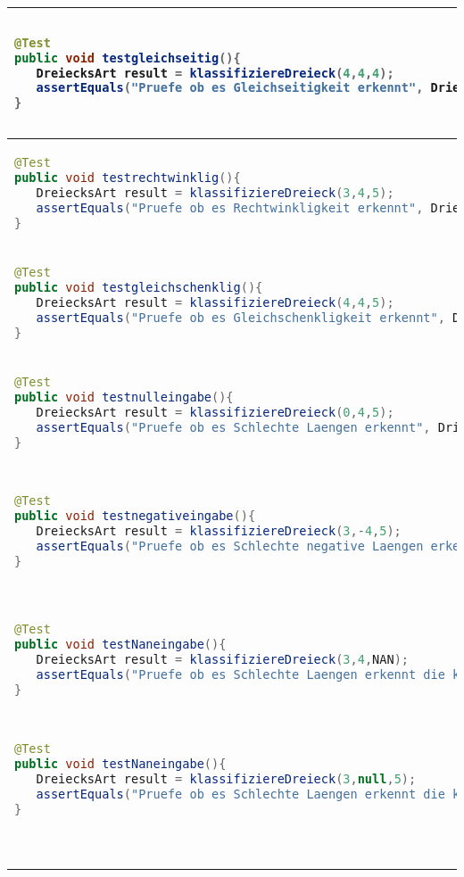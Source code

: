 \begin{parlist}
\begin{center}
\begin{longtable}[c]{ | p{12cm} | p{4cm} | }
\begin{lstlisting}[language=java,frame=trBL]
@Test
public void testgleichseitig(){
   DreiecksArt result = klassifiziereDreieck(4,4,4);
   assertEquals("Pruefe ob es Gleichseitigkeit erkennt", DriecksArt.Gliechseitig, result);
}
  \end{lstlisting} & Need to check if it can recognize equallateral triangles. \\ 
  \hline
  \begin{lstlisting}[language=java,frame=trBL]
@Test
public void testrechtwinklig(){
   DreiecksArt result = klassifiziereDreieck(3,4,5);
   assertEquals("Pruefe ob es Rechtwinkligkeit erkennt", DriecksArt.Rechtwinklig, result);
}
  \end{lstlisting} & Need to check if it can recognize right triangles. \\ 
  \hline
  \begin{lstlisting}[language=java,frame=trBL]
@Test
public void testgleichschenklig(){
   DreiecksArt result = klassifiziereDreieck(4,4,5);
   assertEquals("Pruefe ob es Gleichschenkligkeit erkennt", DriecksArt.Gleichschenklig, result);
}
  \end{lstlisting} &  Need to check if it can recognize isosceles triangles. \\ 
  \hline
  \begin{lstlisting}[language=java,frame=trBL]
@Test
public void testnulleingabe(){
   DreiecksArt result = klassifiziereDreieck(0,4,5);
   assertEquals("Pruefe ob es Schlechte Laengen erkennt", DriecksArt.Normal, result);
}
  \end{lstlisting} &  Need to check if it can recognize invalid lengths. \\ 
 \hline
  \begin{lstlisting}[language=java,frame=trBL]
@Test
public void testnegativeingabe(){
   DreiecksArt result = klassifiziereDreieck(3,-4,5);
   assertEquals("Pruefe ob es Schlechte negative Laengen erkennt", DriecksArt.Normal, result);
}
  \end{lstlisting} &  Need to check if it can recognize invalid lengths that are negative. \\ 
 \hline
\begin{lstlisting}[language=java,frame=trBL]
@Test
public void testNaneingabe(){
   DreiecksArt result = klassifiziereDreieck(3,4,NAN);
   assertEquals("Pruefe ob es Schlechte Laengen erkennt die keine Zahlen sind", DriecksArt.Normal, result);
}
  \end{lstlisting} &  Need to check if it can recognize lengths that are not Numbers. \\ 
 \hline
\begin{lstlisting}[language=java,frame=trBL]
@Test
public void testNaneingabe(){
   DreiecksArt result = klassifiziereDreieck(3,null,5);
   assertEquals("Pruefe ob es Schlechte Laengen erkennt die keine Werte haben", DriecksArt.Normal, result);
}
  \end{lstlisting} &  Need to check if it can recognize lengths that are null. \\ 
\hline
  \begin{lstlisting}[language=java,frame=trBL]


\end{lstlisting}
\end{longtable}
\end{center}
\end{parlist}
